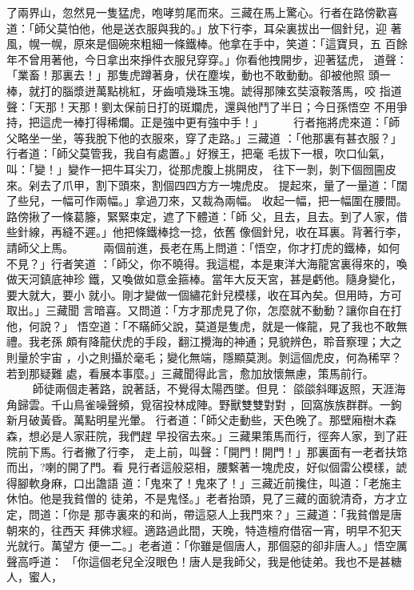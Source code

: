 \begin{pinyinscope}
{了兩界山，忽然見一隻猛虎，咆哮剪尾而來。三藏在馬上驚心。行者在路傍歡喜
道：「師父莫怕他，他是送衣服與我的。」放下行李，耳朵裏拔出一個針兒，迎
著風，幌一幌，原來是個碗來粗細一條鐵棒。他拿在手中，笑道：「這寶貝，五
百餘年不曾用著他，今日拿出來掙件衣服兒穿穿。」你看他拽開步，迎著猛虎，
道聲：「業畜！那裏去！」那隻虎蹲著身，伏在塵埃，動也不敢動動。卻被他照
頭一棒，就打的腦漿迸萬點桃紅，牙齒噴幾珠玉塊。諕得那陳玄奘滾鞍落馬，咬
指道聲：「天那！天那！劉太保前日打的斑斕虎，還與他鬥了半日；今日孫悟空
不用爭持，把這虎一棒打得稀爛。正是強中更有強中手！」
　　
行者拖將虎來道：「師父略坐一坐，等我脫下他的衣服來，穿了走路。」三藏道
：「他那裏有甚衣服？」行者道：「師父莫管我，我自有處置。」好猴王，把毫
毛拔下一根，吹口仙氣，叫：「變！」變作一把牛耳尖刀，從那虎腹上挑開皮，
往下一剝，剝下個囫圇皮來。剁去了爪甲，割下頭來，割個四四方方一塊虎皮。
提起來，量了一量道：「闊了些兒，一幅可作兩幅。」拿過刀來，又裁為兩幅。
收起一幅，把一幅圍在腰間。路傍揪了一條葛籐，緊緊束定，遮了下體道：「師
父，且去，且去。到了人家，借些針線，再縫不遲。」他把條鐵棒捻一捻，依舊
像個針兒，收在耳裏。背著行李，請師父上馬。
　　
兩個前進，長老在馬上問道：「悟空，你才打虎的鐵棒，如何不見？」行者笑道
：「師父，你不曉得。我這棍，本是東洋大海龍宮裏得來的，喚做天河鎮底神珍
鐵，又喚做如意金箍棒。當年大反天宮，甚是虧他。隨身變化，要大就大，要小
就小。剛才變做一個繡花針兒模樣，收在耳內矣。但用時，方可取出。」三藏聞
言暗喜。又問道：「方才那虎見了你，怎麼就不動動？讓你自在打他，何說？」
悟空道：「不瞞師父說，莫道是隻虎，就是一條龍，見了我也不敢無禮。我老孫
頗有降龍伏虎的手段，翻江攪海的神通；見貌辨色，聆音察理；大之則量於宇宙
，小之則攝於毫毛；變化無端，隱顯莫測。剝這個虎皮，何為稀罕？若到那疑難
處，看展本事麼。」三藏聞得此言，愈加放懷無慮，策馬前行。
　　
師徒兩個走著路，說著話，不覺得太陽西墜。但見：
燄燄斜暉返照，天涯海角歸雲。千山鳥雀噪聲頻，覓宿投林成陣。野獸雙雙對對
，回窩族族群群。一鉤新月破黃昏。萬點明星光暈。
行者道：「師父走動些，天色晚了。那壁廂樹木森森，想必是人家莊院，我們趕
早投宿去來。」三藏果策馬而行，徑奔人家，到了莊院前下馬。行者撇了行李，
走上前，叫聲：「開門！開門！」那裏面有一老者扶筇而出，?喇的開了門。看
見行者這般惡相，腰繫著一塊虎皮，好似個雷公模樣，諕得腳軟身麻，口出譫語
道：「鬼來了！鬼來了！」三藏近前攙住，叫道：「老施主休怕。他是我貧僧的
徒弟，不是鬼怪。」老者抬頭，見了三藏的面貌清奇，方才立定，問道：「你是
那寺裏來的和尚，帶這惡人上我門來？」三藏道：「我貧僧是唐朝來的，往西天
拜佛求經。適路過此間，天晚，特造檀府借宿一宵，明早不犯天光就行。萬望方
便一二。」老者道：「你雖是個唐人，那個惡的卻非唐人。」悟空厲聲高呼道：
「你這個老兒全沒眼色！唐人是我師父，我是他徒弟。我也不是甚糖人，蜜人，
}
\end{pinyinscope}

